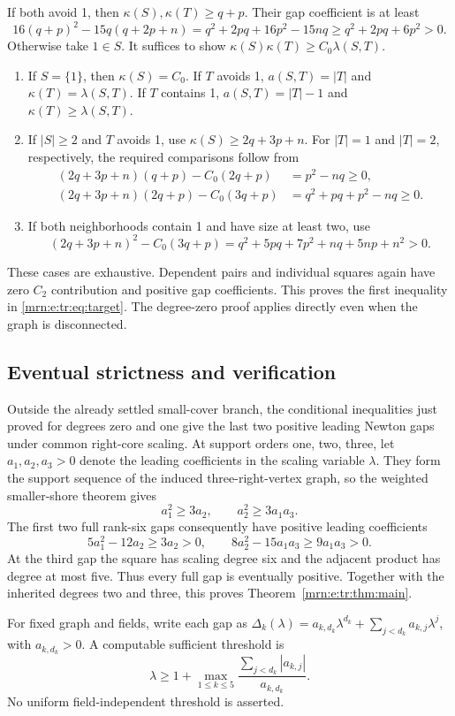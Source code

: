 \documentclass[11pt,a4paper]{article}
\theoremstyle{remark}\newtheorem{remark}[theorem]{Remark}
\begin{document}
If both avoid 1, then $\kappa(S),\kappa(T)\ge q+p$. Their gap coefficient is at least
\[
 16(q+p)^2-15q(q+2p+n)
 =q^2+2pq+16p^2-15nq
 \ge q^2+2pq+6p^2>0.
\]
Otherwise take $1\in S$. It suffices to show
$\kappa(S)\kappa(T)\ge C_0\lambda(S,T)$.
\begin{enumerate}
 \item If $S=\{1\}$, then $\kappa(S)=C_0$. If $T$ avoids 1, $a(S,T)=|T|$ and $\kappa(T)=\lambda(S,T)$. If $T$ contains 1, $a(S,T)=|T|-1$ and $\kappa(T)\ge\lambda(S,T)$.
 \item If $|S|\ge2$ and $T$ avoids 1, use $\kappa(S)\ge2q+3p+n$. For $|T|=1$ and $|T|=2$, respectively, the required comparisons follow from
 \begin{align*}
 (2q+3p+n)(q+p)-C_0(2q+p)&=p^2-nq\ge0,\\
 (2q+3p+n)(2q+p)-C_0(3q+p)&=q^2+pq+p^2-nq\ge0.
 \end{align*}
 \item If both neighborhoods contain 1 and have size at least two, use
 \[
 (2q+3p+n)^2-C_0(3q+p)
   =q^2+5pq+7p^2+nq+5np+n^2>0.
 \]
\end{enumerate}
These cases are exhaustive. Dependent pairs and individual squares again have zero $C_2$ contribution and positive gap coefficients. This proves the first inequality in \eqref{mrn:e:tr:eq:target}. The degree-zero proof applies directly even when the graph is disconnected.

\subsection{Eventual strictness and verification}
Outside the already settled small-cover branch, the conditional inequalities just proved for degrees zero and one give the last two positive leading Newton gaps under common right-core scaling. At support orders one, two, three, let $a_1,a_2,a_3>0$ denote the leading coefficients in the scaling variable $\lambda$. They form the support sequence of the induced three-right-vertex graph, so the weighted smaller-shore theorem gives
\[
 a_1^2\ge3a_2,\qquad a_2^2\ge3a_1a_3.
\]
The first two full rank-six gaps consequently have positive leading coefficients
\[
 5a_1^2-12a_2\ge3a_2>0,\qquad
 8a_2^2-15a_1a_3\ge9a_1a_3>0.
\]
At the third gap the square has scaling degree six and the adjacent product has degree at most five. Thus every full gap is eventually positive. Together with the inherited degrees two and three, this proves Theorem~\ref{mrn:e:tr:thm:main}.

For fixed graph and fields, write each gap as
$\Delta_k(\lambda)=a_{k,d_k}\lambda^{d_k}+\sum_{j<d_k}a_{k,j}\lambda^j$,
with $a_{k,d_k}>0$. A computable sufficient threshold is
\[
 \lambda\ge1+\max_{1\le k\le5}
    \frac{\sum_{j<d_k}|a_{k,j}|}{a_{k,d_k}}.
\]
No uniform field-independent threshold is asserted.
\end{document}
